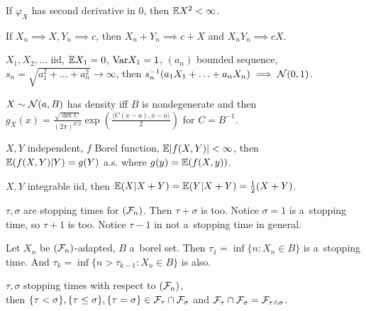 	\begin{proposition}[3.7]
		If $\varphi_X$ has second derivative in $0$, then $\mathbb{E} X^2 < \infty$.
	\end{proposition}
	
	\begin{proposition}[5.9]
		If $X_n \implies X, Y_n \implies c$, 
		then $X_n + Y_n \implies c + X$ and $X_n Y_n \implies cX$.
	\end{proposition}
	
	\begin{proposition}[6.5]
		$X_1, X_2, \ldots$ iid,
		$\mathbb{E} X_1 = 0$, $\mathrm{Var} X_1 = 1$, 
		$(a_n)$ bounded sequence,
		$s_n = \sqrt{a_1^2 + \ldots + a_n^2} \to \infty$, 
		then $s_n^{-1}(a_1 X_1 + \ldots + a_n X_n) \implies \mathcal{N}(0,1)$.
	\end{proposition}
	
	\begin{proposition}[6.7]
		$X \sim \mathcal{N}(a, B)$ has density iff $B$ is nondegenerate
		and then $\displaystyle g_X(x)
		= \frac{\sqrt{\det C}}{(2 \pi)^{d/2}}
		\exp \left( \frac{ \langle C(x-a), x-a\rangle}{2} \right)$ 
		for $C=B^{-1}$.
	\end{proposition}
	
	\begin{proposition}[7.6]
		$X, Y$ independent, $f$ Borel function, $\mathbb{E} |f(X,Y)| < \infty$,
		then \\ $\mathbb{E}(f(X,Y) | Y) = g(Y)$ a.s. where $g(y) = \mathbb{E}(f(X, y))$.
	\end{proposition}
	
	\begin{proposition}[7.7]
		$X, Y$ integrable iid,
		then $\mathbb{E}(X|X+Y) = \mathbb{E}(Y|X+Y) = \frac{1}{2} (X+Y)$.
	\end{proposition}
	
	\begin{proposition}[8.1]
		$\tau, \sigma$ are stopping times for $(\mathcal{F}_n)$.
		Then $\tau + \sigma$ is too.
		Notice $\sigma=1$ is a~stopping time, so $\tau+1$ is too.
		Notice $\tau - 1$ in not a~stopping time in general.
	\end{proposition}
	
	\begin{proposition}[8.2]
		Let $X_n$ be $(\mathcal{F}_n)$-adapted, $B$ a~borel set.
		Then $\tau_1 = \inf\{n:X_n \in B\}$ is a~stopping time.
		And $\tau_k = \inf\{n>\tau_{k-1}: X_n \in B\}$ is also.
	\end{proposition}
	
	\begin{proposition}[8.3]
		$\tau, \sigma$ stopping times with respect to $(\mathcal{F}_n)$, \\
		then $\{\tau < \sigma\}, \{\tau \leq \sigma\}, \{\tau = \sigma\}
			\in \mathcal{F}_\tau \cap \mathcal{F}_\sigma$
		and $\mathcal{F}_\tau \cap \mathcal{F}_\sigma = \mathcal{F}_{\tau \wedge \sigma}$.
	\end{proposition}
	
